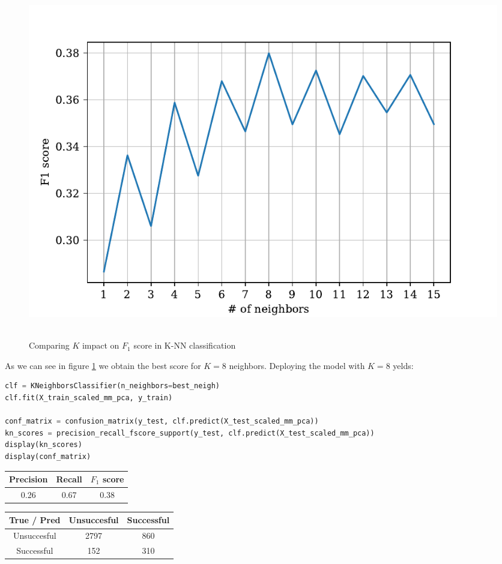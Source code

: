 \begin{figure}[htb]
    \centering
    \includegraphics[scale=0.7]{pictures/neigh_score.pdf}\
    \caption{Comparing \(K\) impact on \(F_1\) score in K-NN classification}
    \label{fig_neigh_score}
\end{figure}
As we can see in figure \ref{fig_neigh_score} we obtain the best score for \(K= 8\) neighbors. Deploying the model with \(K= 8\) yelds:
\begin{lstlisting}[language=Python, caption= Deploying K-NN]
clf = KNeighborsClassifier(n_neighbors=best_neigh)
clf.fit(X_train_scaled_mm_pca, y_train)

conf_matrix = confusion_matrix(y_test, clf.predict(X_test_scaled_mm_pca))
kn_scores = precision_recall_fscore_support(y_test, clf.predict(X_test_scaled_mm_pca))
display(kn_scores)
display(conf_matrix)   
\end{lstlisting}

\begin{center}
    \begin{tabular}{|c|c|c|}
        \hline
        Precision & Recall & \(F_1\) score \\
        \hline
        0.26 & 0.67 & 0.38 \\
        \hline
    \end{tabular}
    \quad     
    \begin{tabular}{|c|c|c|}
        \hline
         True / Pred & Unsuccesful & Successful \\
        \hline
        Unsuccesful & 2797 & 860 \\
        \hline
        Successful & 152 & 310\\
        \hline
    \end{tabular}
\end{center}

